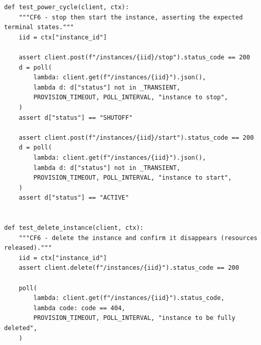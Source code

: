 \begin{lstlisting}
def test_power_cycle(client, ctx):
    """CF6 - stop then start the instance, asserting the expected terminal states."""
    iid = ctx["instance_id"]

    assert client.post(f"/instances/{iid}/stop").status_code == 200
    d = poll(
        lambda: client.get(f"/instances/{iid}").json(),
        lambda d: d["status"] not in _TRANSIENT,
        PROVISION_TIMEOUT, POLL_INTERVAL, "instance to stop",
    )
    assert d["status"] == "SHUTOFF"

    assert client.post(f"/instances/{iid}/start").status_code == 200
    d = poll(
        lambda: client.get(f"/instances/{iid}").json(),
        lambda d: d["status"] not in _TRANSIENT,
        PROVISION_TIMEOUT, POLL_INTERVAL, "instance to start",
    )
    assert d["status"] == "ACTIVE"


def test_delete_instance(client, ctx):
    """CF6 - delete the instance and confirm it disappears (resources released)."""
    iid = ctx["instance_id"]
    assert client.delete(f"/instances/{iid}").status_code == 200

    poll(
        lambda: client.get(f"/instances/{iid}").status_code,
        lambda code: code == 404,
        PROVISION_TIMEOUT, POLL_INTERVAL, "instance to be fully deleted",
    )
\end{lstlisting}
